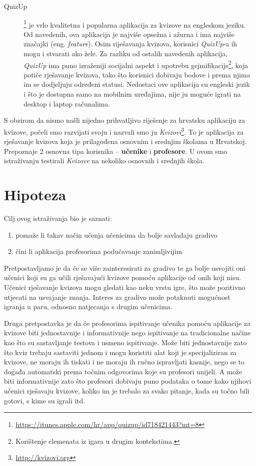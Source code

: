 \documentclass{scrreprt}
\begin{document}
\begin{description}
  \item[QuizUp]\footnote{\url{https://itunes.apple.com/hr/app/quizup/id718421443?mt=8}}
    je vrlo kvalitetna i popularna aplikacija za kvizove na engleskom jeziku. Od
    navedenih, ova aplikacija je najviše opsežna i ažurna i ima najviše značajki
    (eng. \emph{feature}). Osim riješavanja kvizova, korisnici \emph{QuizUp}-a
    ih mogu i stvarati ako žele. Za razliku od ostalih navedenih aplikacija,
    \emph{QuizUp} ima puno izraženiji socijalni aspekt i upotrebu
    gejmifikacije\footnote{Korištenje elemenata iz igara u drugim kontekstima.},
    koja potiče rješavanje kvizova, tako što korisnici dobivaju bodove i prema
    njima im se dodjeljuju određeni statusi. Nedostaci ove aplikacija su
    engleski jezik i što je dostupna samo na mobilnim uređajima, nije ju moguće
    igrati na desktop i laptop računalima.

\end{description}

S obzirom da nismo našli nijedno prihvatljivo riješenje za hrvatsku aplikaciju
za kvizove, počeli smo razvijati svoju i nazvali smo ju
\emph{Kvizovi}\footnote{\url{http://kvizovi.org}}. To je aplikacija za
rješavanje kvizova koja je prilagođena osnovnim i srednjim školama u Hrvatskoj.
Prepoznaje 2 osnovna tipa korisnika -- \textbf{učenike} i \textbf{profesore}. U
ovom smo istraživanju testirali \emph{Kvizove} na nekoliko osnovnih i srednjih
škola.

\chapter{Hipoteza}

Cilj ovog istraživanja bio je saznati:

\begin{enumerate}
  \item pomaže li takav način učenja učenicima da bolje savladaju gradivo
  \item čini li aplikacija profesorima podučavanje zanimljivijim
\end{enumerate}

Pretpostavljamo je da će se više zainteresirati za gradivo te ga bolje usvojiti
oni učenici koji su ga učili rješavajući kvizove pomoću aplikacije od onih koji
nisu. Učenici rješavanje kvizova mogu gledati kao neku vrstu igre, što može
pozitivno utjecati na usvajanje znanja. Interes za gradivo može potaknuti
mogućnost igranja u paru, odnosno natjecanja s drugim učenicima.

Druga pretpostavka je da će profesorima ispitivanje učenika pomoću aplikacije za
kvizove biti jednostavnije i informativnije nego ispitivanje na tradicionalne
načine kao što su sastavljanje testova i usmeno ispitivanje. Može biti
jednostavnije zato što kviz trebaju sastaviti jednom i mogu koristiti alat koji
je specijaliziran za kvizove, ne moraju ih tiskati i ne moraju ih ručno
ispravljati kasnije, nego se to događa automatski prema točnim odgovorima koje
su profesori unijeli. A može biti informativnije zato što profesori dobivaju
puno podataka o tome kako njihovi učenici rješavaju kvizove, koliko im je
trebalo za svako pitanje, kada su točno bili gotovi, s kime su igrali itd.
\end{document}
